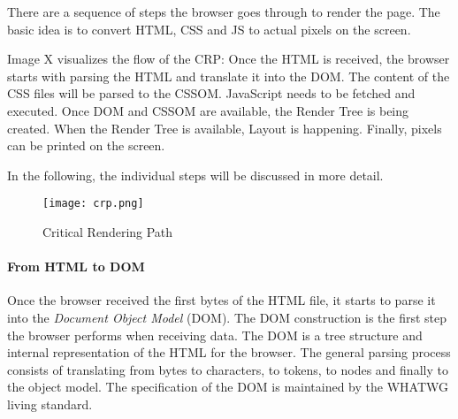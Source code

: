 
There are a sequence of steps the browser goes through to render the page.
The basic idea is to convert HTML, CSS and JS to actual pixels on the screen.

Image X visualizes the flow of the CRP:
Once the HTML is received, the browser starts with parsing the HTML and translate it into the DOM.
The content of the CSS files will be parsed to the CSSOM.
JavaScript needs to be fetched and executed.
Once DOM and CSSOM are available, the Render Tree is being created.
When the Render Tree is available, Layout is happening.
Finally, pixels can be printed on the screen.

In the following, the individual steps will be discussed in more detail.


\begin{figure}[h!]
\begin{center}
\texttt{[image: crp.png]}
\caption{Critical Rendering Path}
\label{img:crp}
\end{center}
\end{figure}









\paragraph{From HTML to DOM}


Once the browser received the first bytes of the HTML file, it starts to parse it into the \textit{Document Object Model} (DOM).
The DOM construction is the first step the browser performs when receiving data.
The DOM is a tree structure and internal representation of the HTML for the browser. %
The general parsing process consists of translating from bytes to characters, to tokens, to nodes and finally to the object model.%
The specification of the DOM is maintained by the WHATWG living standard. %

